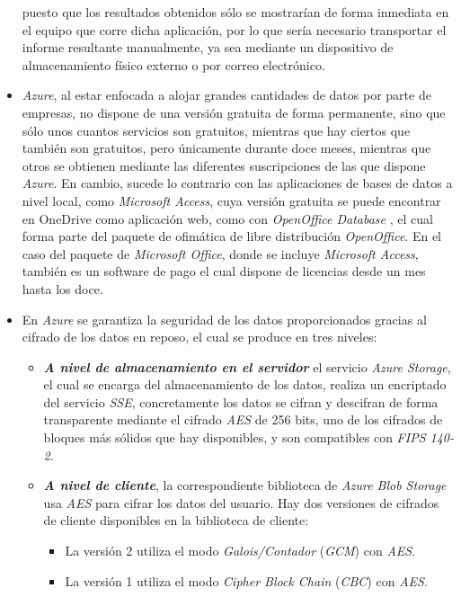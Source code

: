 \begin{itemize}
        puesto que los resultados obtenidos sólo se mostrarían de forma inmediata en el equipo que corre dicha aplicación, por lo que sería necesario transportar el informe resultante manualmente, ya sea mediante un dispositivo de almacenamiento físico externo o por correo electrónico.
        \item \textit{Azure}, al estar enfocada a alojar grandes cantidades de datos por parte de empresas, no dispone de una versión gratuita de forma permanente, sino que sólo unos cuantos servicios son gratuitos, mientras que hay ciertos que también son gratuitos, pero únicamente durante doce meses, mientras que otros
        se obtienen mediante las diferentes suscripciones de las que dispone \textit{Azure}. En cambio, sucede lo contrario con las aplicaciones de bases de datos a nivel local, como \textit{Microsoft Access}, cuya versión gratuita se puede encontrar en OneDrive como aplicación web, como con \textit{OpenOffice Database}
        , el cual forma parte del paquete de ofimática de libre distribución \textit{OpenOffice}. En el caso del paquete de \textit{Microsoft Office}, donde se incluye \textit{Microsoft Access}, también es un software de pago el cual dispone de licencias desde un mes 
        hasta los doce.
        \item En \textit{Azure} se garantiza la seguridad de los datos proporcionados gracias al cifrado de los datos en reposo, el cual se produce en tres niveles:
        \begin{itemize}
            \item \textbf{\textit{A nivel de almacenamiento en el servidor}} el servicio \textit{Azure Storage}, el cual se encarga del almacenamiento de los datos, 
            realiza un encriptado del servicio \textit{SSE}, concretamente los datos se cifran y descifran de forma transparente mediante el cifrado \textit{AES} de 256 bits,
            uno de los cifrados de bloques más sólidos que hay disponibles, y son compatibles con \textit{FIPS 140-2}.
            \item \textbf{\textit{A nivel de cliente}}, la correspondiente biblioteca de \textit{Azure Blob Storage} usa \textit{AES} para cifrar los datos del usuario. 
            Hay dos versiones de cifrados de cliente disponibles en la biblioteca de cliente:
            \begin{itemize}
                \item La versión 2 utiliza el modo \textit{Galois/Contador} (\textit{GCM}) con \textit{AES}.
                \item La versión 1 utiliza el modo \textit{Cipher Block Chain} (\textit{CBC}) con \textit{AES}.

\end{itemize}
\end{itemize}
\end{itemize}
